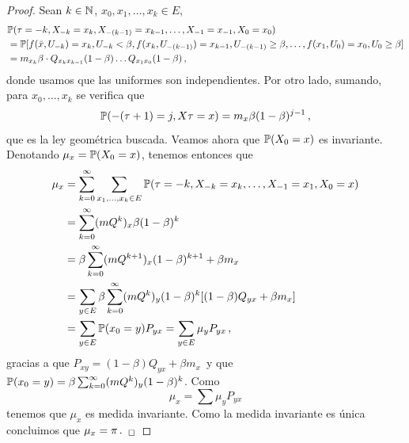 \begin{proof} %
\gris
Sean $k\in\N$, $x_0,x_1,\dots,x_k\in E$,
\begin{alignat*}{2}
    & \P(\tau = -k,X_{-k}=x_k,X_{-(k-1)}=x_{k-1},\dots,X_{-1}=x_{-1},X_0=x_0) \\ & = \P[f(\bar{x},U_{-k})=x_k,U_{-k}<\beta,f(x_k,U_{-(k-1)})=x_{k-1},U_{-(k-1)}\geq\beta,\dots,f(x_{1},U_0)=x_0,U_0\geq\beta] \\
    & = m_{x_k}\beta\cdot Q_{x_k x_{k-1}}(1-\beta)\dots Q_{x_1 x_0}(1-\beta) \, ,
\end{alignat*}
donde usamos que las uniformes son independientes.
Por otro lado, sumando, para $x_0,\dots,x_k$ se verifica que
$$ \P(-(\tau+1)=j,X\tau=x)=m_x\beta(1-\beta)^{j-1} \, ,$$
que es la ley geométrica buscada. Veamos ahora que $\P(X_0=x)$ es invariante.
\\ Denotando $\mu_x=\P(X_0=x)$, tenemos entonces que 
\begin{alignat*}{2}
    \mu_x & = \displaystyle \sum^\infty_{k=0}\sum_{x_1,\dots,x_k\in E}\P(\tau=-k,X_{-k}=x_k,\dots,X_{-1}=x_1,X_0=x) \\
    & = \sum_{k=0}^\infty(mQ^k)_x\beta(1-\beta)^k \\
    & = \beta\sum^\infty_{k=0}(mQ^{k+1})_x(1-\beta)^{k+1}+\beta m_x \\
    & = \sum_{y\in E}\beta\sum^\infty_{k=0}(mQ^{k})_y(1-\beta)^{k}[(1-\beta)Q_{yx}+\beta m_x] \\
    & = \sum_{y\in E}\P(x_0=y)P_{yx} = \sum_{y\in E}\mu_y P_{yx}\,,
\end{alignat*}
gracias a que $P_{xy}=(1-\beta)Q_{yx}+\beta m_x$\, y que $\P(x_0=y)=\beta\sum^\infty_{k=0}(mQ^{k})_y(1-\beta)^{k}$. Como
$$ \mu_x = \displaystyle\sum \mu_yP_{yx}$$
tenemos que $\mu_x$ es medida invariante. Como la medida invariante es única concluimos que $\mu_x=\pi\, . \findem$
\negro
\end{proof}

